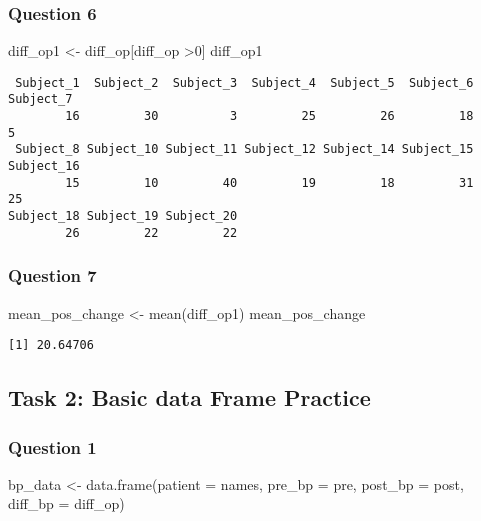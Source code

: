 \documentclass[
  letterpaper,
  DIV=11,
  numbers=noendperiod]{scrartcl}
\newenvironment{Shaded}{\begin{snugshade}}{\end{snugshade}}
\newcommand{\AttributeTok}[1]{\textcolor[rgb]{0.40,0.45,0.13}{#1}}
\newcommand{\DecValTok}[1]{\textcolor[rgb]{0.68,0.00,0.00}{#1}}
\newcommand{\FunctionTok}[1]{\textcolor[rgb]{0.28,0.35,0.67}{#1}}
\newcommand{\NormalTok}[1]{\textcolor[rgb]{0.00,0.23,0.31}{#1}}
\newcommand{\OtherTok}[1]{\textcolor[rgb]{0.00,0.23,0.31}{#1}}
\newcommand{\SpecialCharTok}[1]{\textcolor[rgb]{0.37,0.37,0.37}{#1}}
\begin{document}
\subsubsection{Question 6}\label{question-6}

\begin{Shaded}
\begin{Highlighting}[]
\NormalTok{diff\_op1 }\OtherTok{\textless{}{-}}\NormalTok{ diff\_op[diff\_op }\SpecialCharTok{\textgreater{}}\DecValTok{0}\NormalTok{]}
\NormalTok{diff\_op1}
\end{Highlighting}
\end{Shaded}

\begin{verbatim}
 Subject_1  Subject_2  Subject_3  Subject_4  Subject_5  Subject_6  Subject_7 
        16         30          3         25         26         18          5 
 Subject_8 Subject_10 Subject_11 Subject_12 Subject_14 Subject_15 Subject_16 
        15         10         40         19         18         31         25 
Subject_18 Subject_19 Subject_20 
        26         22         22 
\end{verbatim}

\subsubsection{Question 7}\label{question-7}

\begin{Shaded}
\begin{Highlighting}[]
\NormalTok{mean\_pos\_change }\OtherTok{\textless{}{-}} \FunctionTok{mean}\NormalTok{(diff\_op1)}
\NormalTok{mean\_pos\_change}
\end{Highlighting}
\end{Shaded}

\begin{verbatim}
[1] 20.64706
\end{verbatim}

\subsection{Task 2: Basic data Frame
Practice}\label{task-2-basic-data-frame-practice}

\subsubsection{Question 1}\label{question-1-1}

\begin{Shaded}
\begin{Highlighting}[]
\NormalTok{bp\_data }\OtherTok{\textless{}{-}} \FunctionTok{data.frame}\NormalTok{(}\AttributeTok{patient =}\NormalTok{ names, }\AttributeTok{pre\_bp =}\NormalTok{ pre, }\AttributeTok{post\_bp =}\NormalTok{ post, }\AttributeTok{diff\_bp =}\NormalTok{ diff\_op)}
\end{Highlighting}
\end{Shaded}
\end{document}
